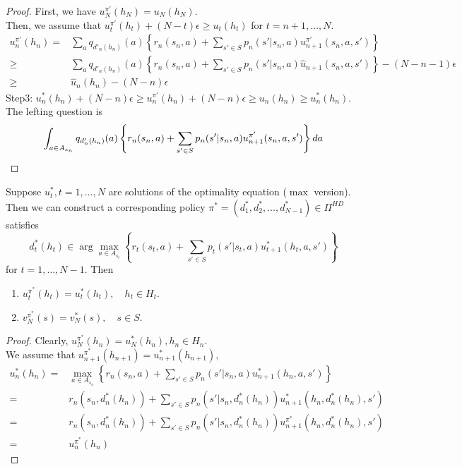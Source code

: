 \begin{definition}
\begin{proof}
        First, we have $ u^{\pi'}_N(h_N) = u_N(h_N) $.\\
        Then, we assume that $ u^{\pi'}_t(h_t) + (N-t) \epsilon \ge u_t(h_t) $ for $ t = n+1, \ldots, N $.
        \begin{align*}
            u^{\pi'}_n(h_n) =& \sum^{}_{a} q_{d'_n(h_n)} (a) \left\{ r_n(s_n, a) + \sum^{}_{s' \in S} p_n(s' | s_n, a) u^{\pi'}_{n+1}(s_n, a, s') \right\}\\
            \ge& \sum^{}_{a} q_{d'_n(h_n)} (a) \left\{ r_n(s_n, a) + \sum^{}_{s' \in S} p_n(s' | s_n, a) \hat u_{n+1}(s_n, a, s') \right\} - (N-n-1)\epsilon\\
            \ge& \hat u_n(h_n) - (N - n) \epsilon
        \end{align*}
        Step3:
        $ u^*_n(h_n) + (N-n) \epsilon \ge u^{\pi'}_n(h_n) + (N-n) \epsilon \ge u_n(h_n) \ge u^*_n(h_n) $.\\
        The lefting question is 
        \[
            \int^{}_{a \in A_{s_n}} q_{d'_n(h_n)} (a) \left\{ r_n(s_n, a) + \sum^{}_{s' \in S} p_n(s' | s_n, a) u^{\pi'}_{n+1} (s_n, a, s') \right\} da\\
        \]
    \end{proof}
\end{definition}

\begin{theorem}
    Suppose $ u^*_t, t = 1, \ldots, N $ are solutions of the optimality equation ($ \max $ version). 
    Then we can construct a corresponding policy $ \pi^*  = (d^*_1, d^*_2, \ldots, d^*_{N-1}) \in \Pi^{HD}$ satisfies
    \[
        d^*_t(h_t) \in \arg\max_{a \in A_{s_t}} \left\{ r_t(s_t, a) + \sum^{}_{s' \in S} p_t(s' | s_t, a) u^*_{t+1}(h_t, a, s') \right\}
    \]
    for $ t = 1, \ldots, N-1 $.
    Then
    \begin{enumerate}
        \item $ u^{\pi^*}_t(h_t) = u^*_t(h_t), \quad h_t \in H_t $.
        \item $ v^{\pi^*}_N(s) = v^*_N(s), \quad s \in S$.
    \end{enumerate}
    \begin{proof}
        Clearly, $ u^{\pi^*}_N(h_n) = u^*_N(h_n), h_n \in H_n $. \\
        We assume that $ u^{\pi^*}_{n+1}(h_{n+1}) = u^*_{n+1}(h_{n+1}) $, 
        \begin{align*}
            u^*_n(h_n) =& \max_{a \in A_{s_n}} \left\{ r_n(s_n, a) + \sum^{}_{s' \in S} p_n(s' | s_n, a) u^*_{n+1} (h_n, a, s') \right\} \\
            =& r_n(s_n, d^*_n(h_n)) + \sum^{}_{s' \in S} p_n(s' | s_n, d^*_n(h_n)) u^*_{n+1} (h_n, d^*_n(h_n), s')\\
            =& r_n(s_n, d^*_n(h_n)) + \sum^{}_{s' \in S} p_n(s' | s_n, d^*_n(h_n)) u^{\pi^*}_{n+1} (h_n, d^*_n(h_n), s')\\
            =& u^{\pi^*}_n(h_n)
        \end{align*}
    \end{proof}
\end{theorem}

